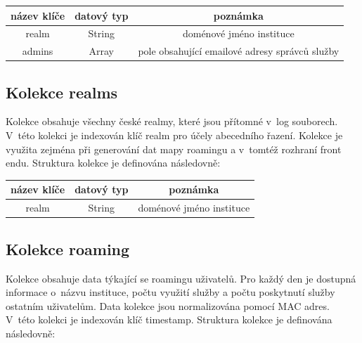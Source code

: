 \documentclass[thesis=M,czech]{FITthesis}[2012/06/26]
\begin{document}
      \begin{center}
        \begin{tabular}{ | c | c | c | }
          \hline
            název klíče & datový typ & poznámka                                          \\ \hline
            realm       & String     & doménové jméno instituce                          \\ \hline
            admins      & Array      & pole obsahující emailové adresy správců služby    \\
          \hline
        \end{tabular}
      \end{center}
    
    \subsection{Kolekce realms}

      Kolekce obsahuje všechny české realmy,
      které jsou přítomné v~log souborech.
      V~této kolekci je indexován klíč realm pro účely abecedního řazení.
      Kolekce je využita zejména při generování dat mapy roamingu
      a v~tomtéž rozhraní front endu.
      Struktura kolekce je definována následovně:
      
      \begin{center}
        \begin{tabular}{ | c | c | c | }
          \hline
            název klíče   & datový typ & poznámka                   \\ \hline
            realm         & String     & doménové jméno instituce   \\
          \hline
        \end{tabular}
      \end{center}

    \subsection{Kolekce roaming}
    
      Kolekce obsahuje data týkající se roamingu uživatelů.
      Pro každý den je dostupná informace o~názvu instituce,
      počtu využití služby a počtu poskytnutí služby ostatním uživatelům.
      Data kolekce jsou normalizována pomocí MAC adres.
      V~této kolekci je indexován klíč timestamp.
      Struktura kolekce je definována následovně:
      
\end{document}
